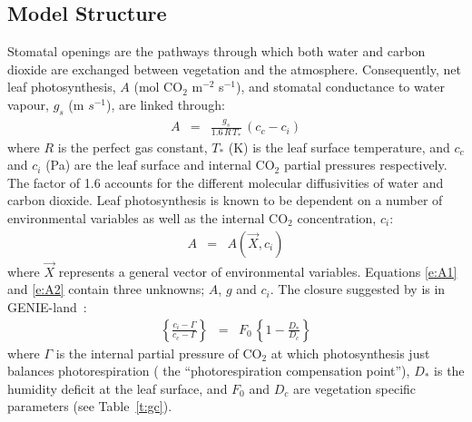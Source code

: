 \documentclass[a4paper]{article}
\newcommand{\gnl}{GENIE-land}
\begin{document}
\subsection{Model Structure} \label{s:photo.stru}
Stomatal openings are the pathways through which both water and carbon
dioxide are exchanged between vegetation and the atmosphere.
Consequently, net leaf photosynthesis, $A$ (mol CO$_{2}$ m$^{-2}$
s$^{-1}$), and stomatal conductance to water vapour, $g_s$ (m
$s^{-1}$), are linked through:
\begin{eqnarray} 
A &=& \frac{g_s}{1.6 \, R \, T_{*}} \,(c_{c} - c_{i})
\label{e:A1}
\end{eqnarray}
where $R$ is the perfect gas constant, $T_{*}$ (K) is the leaf surface
temperature, and $c_{c}$ and $c_{i}$ (Pa) are the leaf surface and
internal CO$_{2}$ partial pressures respectively. The factor of 1.6
accounts for the different molecular diffusivities of water and carbon
dioxide. Leaf photosynthesis is known to be dependent on a number of
environmental variables as well as the internal CO$_{2}$
concentration, $c_{i}$:
\begin{eqnarray}
A &=& A (\vec{X},c_{i})
\label{e:A2}
\end{eqnarray} 
where $\vec{X}$ represents a general vector of environmental
variables.  Equations \eqref{e:A1} and \eqref{e:A2} contain three
unknowns; $A$, $g$ and $c_{i}$. The closure suggested by
\citet{Jac94} is in \gnl\ \citep{Cox98,Cox99}:
\begin{eqnarray}
\left\{ \frac{c_{i}-\Gamma}{c_{c}-\Gamma} \right\}
&=& F_{0} \, \left\{ 1 - \frac{D_{*}}{D_{c}} \right\}
\label{e:A3}
\end{eqnarray}
where $\Gamma$ is the internal partial pressure of CO$_{2}$ at which
photosynthesis just balances photorespiration ( the ``photorespiration
compensation point''), $D_{*}$ is the humidity deficit at the leaf
surface, and $F_{0}$ and $D_{c}$ are vegetation specific parameters
(see Table~\ref{t:gc}).
\end{document}

